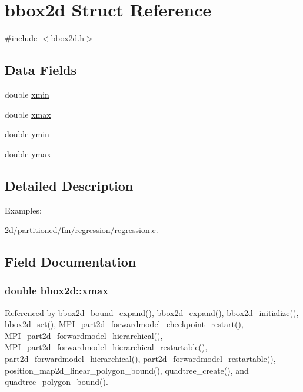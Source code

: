 \hypertarget{structbbox2d}{}\section{bbox2d Struct Reference}
\label{structbbox2d}


{\ttfamily \#include $<$bbox2d.\+h$>$}

\subsection*{Data Fields}
\begin{DoxyCompactItemize}
\item 
double \hyperlink{structbbox2d_ab1e3c3b237d5a3b1290607bb0fa67b86}{xmin}
\item 
double \hyperlink{structbbox2d_a1bd0acf6ace939571bf8711ebadd761e}{xmax}
\item 
double \hyperlink{structbbox2d_aad7439c67803e5ecc96a70ed0cfd1a28}{ymin}
\item 
double \hyperlink{structbbox2d_a40b610959dbfc797e21296a0dffeaaff}{ymax}
\end{DoxyCompactItemize}


\subsection{Detailed Description}
\begin{Desc}
\item[Examples\+: ]\par
\hyperlink{2d_2partitioned_2fm_2regression_2regression_8c-example}{2d/partitioned/fm/regression/regression.\+c}.\end{Desc}


\subsection{Field Documentation}
\subsubsection[{\texorpdfstring{xmax}{xmax}}]{\setlength{\rightskip}{0pt plus 5cm}double bbox2d\+::xmax}\hypertarget{structbbox2d_a1bd0acf6ace939571bf8711ebadd761e}{}\label{structbbox2d_a1bd0acf6ace939571bf8711ebadd761e}


Referenced by bbox2d\+\_\+bound\+\_\+expand(), bbox2d\+\_\+expand(), bbox2d\+\_\+initialize(), bbox2d\+\_\+set(), M\+P\+I\+\_\+part2d\+\_\+forwardmodel\+\_\+checkpoint\+\_\+restart(), M\+P\+I\+\_\+part2d\+\_\+forwardmodel\+\_\+hierarchical(), M\+P\+I\+\_\+part2d\+\_\+forwardmodel\+\_\+hierarchical\+\_\+restartable(), part2d\+\_\+forwardmodel\+\_\+hierarchical(), part2d\+\_\+forwardmodel\+\_\+restartable(), position\+\_\+map2d\+\_\+linear\+\_\+polygon\+\_\+bound(), quadtree\+\_\+create(), and quadtree\+\_\+polygon\+\_\+bound().

